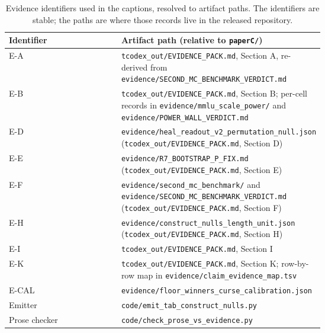 \begin{table}[t]
\centering
\small
\setlength{\tabcolsep}{4pt}
\begin{tabular}{lp{0.62\linewidth}}
\toprule
Identifier & Artifact path (relative to \texttt{paperC/}) \\
\midrule
\textsf{E-A} & \texttt{tcodex\_out/EVIDENCE\_PACK.md}, Section A, re-derived from \texttt{evidence/SECOND\_MC\_BENCHMARK\_VERDICT.md} \\
\textsf{E-B} & \texttt{tcodex\_out/EVIDENCE\_PACK.md}, Section B; per-cell records in \texttt{evidence/mmlu\_scale\_power/} and \texttt{evidence/POWER\_WALL\_VERDICT.md} \\
\textsf{E-D} & \texttt{evidence/heal\_readout\_v2\_permutation\_null.json} (\texttt{tcodex\_out/EVIDENCE\_PACK.md}, Section D) \\
\textsf{E-E} & \texttt{evidence/R7\_BOOTSTRAP\_P\_FIX.md} (\texttt{tcodex\_out/EVIDENCE\_PACK.md}, Section E) \\
\textsf{E-F} & \texttt{evidence/second\_mc\_benchmark/} and \texttt{evidence/SECOND\_MC\_BENCHMARK\_VERDICT.md} (\texttt{tcodex\_out/EVIDENCE\_PACK.md}, Section F) \\
\textsf{E-H} & \texttt{evidence/construct\_nulls\_length\_unit.json} (\texttt{tcodex\_out/EVIDENCE\_PACK.md}, Section H) \\
\textsf{E-I} & \texttt{tcodex\_out/EVIDENCE\_PACK.md}, Section I \\
\textsf{E-K} & \texttt{tcodex\_out/EVIDENCE\_PACK.md}, Section K; row-by-row map in \texttt{evidence/claim\_evidence\_map.tsv} \\
\textsf{E-CAL} & \texttt{evidence/floor\_winners\_curse\_calibration.json} \\
Emitter & \texttt{code/emit\_tab\_construct\_nulls.py} \\
Prose checker & \texttt{code/check\_prose\_vs\_evidence.py} \\
\bottomrule
\end{tabular}
\caption{Evidence identifiers used in the captions, resolved to artifact paths. The identifiers are stable; the paths are where those records live in the released repository.}
\label{tab:artifact-map}
\end{table}
